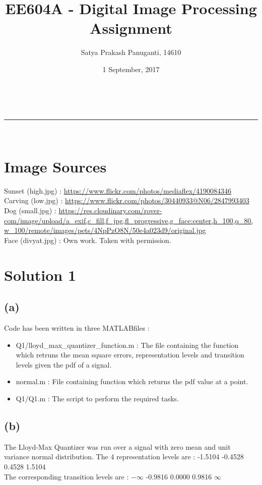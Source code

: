 \documentclass[a4paper,fleqn,11pt]{article}
\makeatletter
\newcommand{\linia}{\rule{\linewidth}{0.5pt}}
\theoremstyle{mytheor}
\renewcommand{\maketitle}{
\begin{center}
\vspace{2ex}
{\huge \textsc{\@title}}
\vspace{1ex}
\\
\linia\\
\@author \hfill \@date
\vspace{4ex}
\end{center}
}
\makeatother
\begin{document}
\title{EE604A - Digital Image Processing Assignment}

\author{Satya Prakash Panuganti, 14610}

\date{1 September, 2017}

\maketitle

\section*{Image Sources}
Sunset  (high.jpg)  : \url{https://www.flickr.com/photos/mediaflex/4190084346} \\
Carving (low.jpg)   : \url{https://www.flickr.com/photos/30440933@N06/2847993403} \\
Dog     (small.jpg) : \url{https://res.cloudinary.com/rover-com/image/upload/a_exif,c_fill,f_jpg,fl_progressive,g_face:center,h_100,q_80,w_100/remote/images/pets/4NpPzO8N/50e4a023d9/original.jpg} \\
Face (divyat.jpg)   : Own work. Taken with permission.
\section*{Solution 1}
\subsection*{(a)}
Code has been written in three MATLAB\textregistered  files :
\begin{itemize}
\item Q1/lloyd\_max\_quantizer\_function.m : The file containing the function which retruns the mean square errors, representation levels and transition levels given the pdf of a signal.
\item normal.m : File containing function which returns the pdf value at a point.
\item Q1/Q1.m : The script to perform the required tasks.
\end{itemize}
\subsection*{(b)}
The Lloyd-Max Quantizer was run over a signal with zero mean and unit variance normal distribution.
The 4 representation levels are : -1.5104  -0.4528  0.4528  1.5104 \\
The corresponding transition levels are : $-\infty$  -0.9816  0.0000  0.9816  $\infty$
\end{document}
